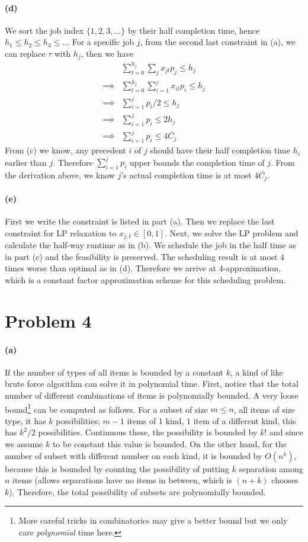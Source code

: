 \documentclass[12pt]{article}
\begin{document}
\paragraph{(d)} We sort the job index $\{1, 2, 3, ...\}$ by their half completion time, hence $h_1 \leq h_2 \leq h_3 \leq \dots$ For a specific job $j$, from the second last constraint in (a), we can replace $\tau$ with $h_j$, then we have 
\begin{align*}
& \sum_{t=0}^{h_j} \sum_{j} x_{jt}p_{j} \leq h_j\\
\implies & \sum_{t=0}^{h_j} \sum_{i=1}^{j} x_{it}p_{i} \leq h_j\\
\implies & \sum_{i=1}^{j} p_{i} /2 \leq h_j\\
\implies & \sum_{i=1}^{j} p_{i} \leq 2h_j\\
\implies & \sum_{i=1}^{j} p_{i} \leq 4 \bar{C_j}
\end{align*}
From (c) we know, any precedent $i$ of $j$ should have their half completion time $h_i$ earlier than $j$. Therefore $\sum_{i=1}^{j} p_{i}$ upper bounds the completion time of $j$. From the derivation above, we know $j$'s actual completion time is at most $4 \bar{C_j}$.

\paragraph{(e)} First we write the constraint is listed in part (a). Then we replace the last constraint for LP relaxation to $x_{j,t} \in [0, 1]$. Next, we solve the LP problem and calculate the half-way runtime as in (b). We schedule the job in the half time as in part (c) and the feasibility is preserved. The scheduling result is at most $4$ times worse than optimal as in (d). Therefore we arrive at $4$-approximation, which is a constant factor approximation scheme for this scheduling problem.

\newpage
\section*{Problem 4}
\paragraph{(a)} If the number of types of all items is bounded by a constant $k$, a kind of like brute force algorithm can solve it in polynomial time. First, notice that the total number of different combinations of items is polynomially bounded. A very loose bound\footnote{More careful tricks in combinatorics may give a better bound but we only care \emph{polynomial} time here.} can be computed as follows. For a subset of size $m \leq n$, all items of size type, it has $k$ possibilities; $m-1$ items of 1 kind, $1$ item of a different kind, this has $k^2/2$ possibilities. Continuous these, the possibility is bounded by $k!$ and since we assume $k$ to be constant this value is bounded. On the other hand, for the number of subset with different number on each kind, it is bounded by $O(n^k)$, because this is bounded by counting the possibility of putting $k$ separation among $n$ items (allows separations have no items in between, which is $(n+k)$ chooses $k$). Therefore, the total possibility of subsets are polynomially bounded. 
\end{document}

